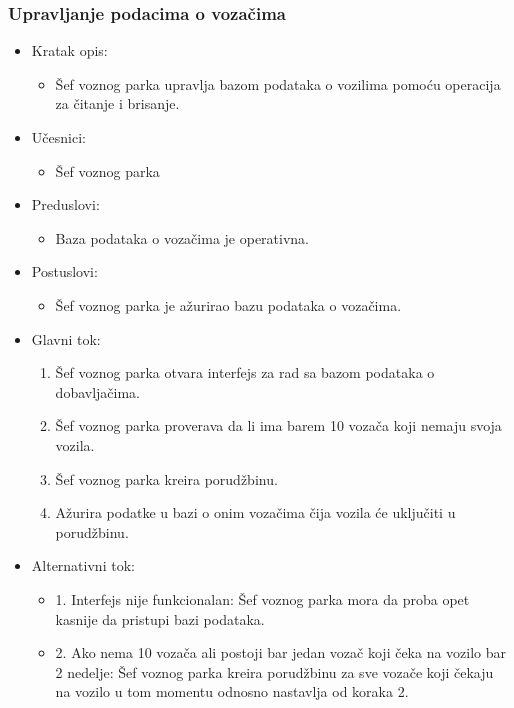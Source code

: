 \subsubsection{\bfseries Upravljanje podacima o vozačima}

\begin{itemize}
	\item Kratak opis:
		\begin{itemize}
			\item Šef voznog parka upravlja bazom podataka o vozilima pomoću operacija za čitanje i brisanje.
		\end{itemize}

	\item Učesnici:
		\begin{itemize}
		    \item Šef voznog parka
		\end{itemize}


	\item Preduslovi:
		\begin{itemize}
		    \item Baza podataka o vozačima je operativna.
		\end{itemize}


	\item Postuslovi:
		\begin{itemize}
			\item Šef voznog parka je ažurirao bazu podataka o vozačima.
	\end{itemize}

	\item Glavni tok:
		\begin{enumerate}
		    \item Šef voznog parka otvara interfejs za rad sa bazom podataka o dobavljačima.
		    \item Šef voznog parka proverava da li ima barem 10 vozača koji nemaju svoja vozila.
		    \item Šef voznog parka kreira porudžbinu.
			\item Ažurira podatke u bazi o onim vozačima čija vozila će uključiti u porudžbinu.
		\end{enumerate}

	\item Alternativni tok:
		\begin{itemize}
		    \item 1. Interfejs nije funkcionalan: Šef voznog parka mora da proba opet kasnije da pristupi bazi podataka.
			\item 2. Ako nema 10 vozača ali postoji bar jedan vozač koji čeka na vozilo bar 2 nedelje: Šef voznog parka kreira porudžbinu za sve vozače koji čekaju na vozilo u tom momentu odnosno nastavlja od koraka 2.
		\end{itemize}

\end{itemize}

